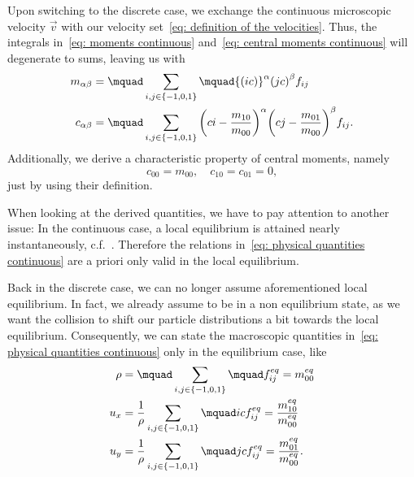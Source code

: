 Upon switching to the discrete case, we exchange the continuous microscopic velocity $\vec{v}$ with our velocity set~\eqref{eq: definition of the velocities}.
Thus, the integrals in~\eqref{eq: moments continuous} and~\eqref{eq: central moments continuous} will degenerate to sums, leaving us with
\begin{align}
  m_{\alpha\beta} &= \mquad\sum_{i,j \in \{-1,0,1\}}\mquad {(ic)}^\alpha {(jc)}^\beta f_{ij}
  \label{eq: moment definition}\\
  c_{\alpha\beta} &= \mquad\sum_{i,j \in \{-1,0,1\}}
  {\left(ci - \frac{m_{10}}{m_{00}}\right)}^\alpha
  {\left(cj - \frac{m_{01}}{m_{00}}\right)}^\beta f_{ij}.
  \label{eq: central moment definition}
\end{align}
Additionally, we derive a characteristic property of central moments, namely
\begin{equation}
  \label{eq: low central moments}
  c_{00}=m_{00},\quad c_{10} = c_{01}=0,
\end{equation}
just by using their definition.

When looking at the derived quantities, we have to pay attention to another issue:
In the continuous case, a local equilibrium is attained nearly instantaneously, c.f.~\cite[page 218]{smits2000physical}.
Therefore the relations in~\eqref{eq: physical quantities continuous} are a priori only valid in the local equilibrium.

Back in the discrete case, we can no longer assume aforementioned local equilibrium.
In fact, we already assume to be in a non equilibrium state, as we want the collision to shift our particle distributions a bit towards the local equilibrium.
Consequently, we can state the macroscopic quantities in~\eqref{eq: physical quantities continuous} only in the equilibrium case, like
\begin{align}
  \rho & = \mquad\sum_{i,j \in \{-1,0,1\}}\mquad f_{ij}^{eq} = m_{00}^{eq}
  \label{eq: density definition raw}\\
  u_x  & = \frac{1}{\rho} \sum_{i,j \in \{-1,0,1\}}\mquad ic f_{ij}^{eq} = \frac{m_{10}^{eq}}{m_{00}^{eq}}
  \label{eq: x velocity definition raw}\\
  u_y  & = \frac{1}{\rho} \sum_{i,j \in \{-1,0,1\}}\mquad jc f_{ij}^{eq} = \frac{m_{01}^{eq}}{m_{00}^{eq}}.
  \label{eq: y velocity definition raw}
\end{align}

